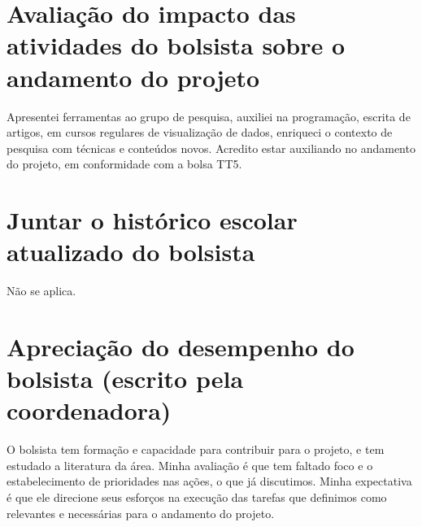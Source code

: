 \documentclass[a4paper, 11pt]{article}
\begin{document}
\section{Avaliação do impacto das atividades do bolsista sobre o andamento do projeto}
Apresentei ferramentas ao grupo de pesquisa, auxiliei na programação, escrita de artigos, em cursos regulares de visualização de dados,
enriqueci o contexto de pesquisa com técnicas e conteúdos novos.
Acredito estar auxiliando no andamento do projeto, em conformidade com a bolsa TT5.

\section{Juntar o histórico escolar atualizado do bolsista}
Não se aplica.

\section{Apreciação do desempenho do bolsista (escrito pela coordenadora)}
O bolsista tem formação e capacidade para contribuir para o projeto, e tem estudado a literatura da área. Minha 
avaliação é que tem faltado foco e o estabelecimento de prioridades nas ações, o que já discutimos. Minha 
expectativa é que ele direcione seus esforços na execução das tarefas que definimos como relevantes e  necessárias 
para o andamento do projeto.
\end{document}
